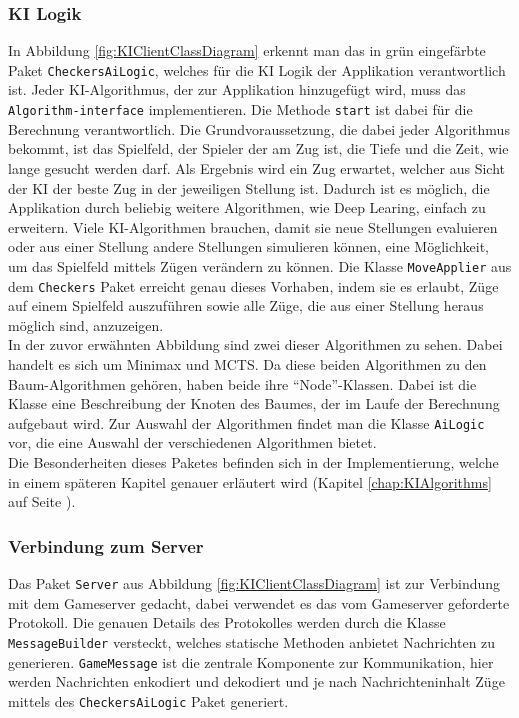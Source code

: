 \documentclass[12pt,a4paper,bibliography=totocnumbered,listof=totocnumbered]{article}
\begin{document}
\subsubsection{\ac{KI} Logik}
In Abbildung \ref{fig:KIClientClassDiagram} erkennt man das in grün eingefärbte Paket \texttt{CheckersAiLogic}, welches für die KI Logik der Applikation verantwortlich ist.
Jeder \ac{KI}-Algorithmus, der zur Applikation hinzugefügt wird, muss das \texttt{Algorithm-interface} implementieren. Die Methode \texttt{start} ist dabei für die Berechnung 
verantwortlich. Die Grundvoraussetzung, die dabei jeder Algorithmus bekommt, ist das Spielfeld, der Spieler der am Zug ist, die Tiefe und die Zeit, wie lange gesucht werden darf.
Als Ergebnis wird ein Zug erwartet, welcher aus Sicht der \ac{KI} der beste Zug in der jeweiligen Stellung ist. Dadurch ist es möglich, die Applikation durch beliebig weitere 
Algorithmen, wie Deep Learing, einfach zu erweitern. 
Viele \ac{KI}-Algorithmen brauchen, damit sie neue Stellungen evaluieren oder aus einer Stellung andere Stellungen simulieren können, eine Möglichkeit, um das Spielfeld mittels 
Zügen verändern zu können. Die Klasse \texttt{MoveApplier} aus dem \texttt{Checkers} Paket erreicht genau dieses Vorhaben, indem sie es erlaubt, Züge auf einem Spielfeld auszuführen 
sowie alle Züge, die aus einer Stellung heraus möglich sind, anzuzeigen.
\\
In der zuvor erwähnten Abbildung sind zwei dieser Algorithmen zu sehen. Dabei handelt es sich um Minimax und MCTS. Da diese beiden Algorithmen zu den Baum-Algorithmen
gehören, haben beide ihre ``Node''-Klassen. Dabei ist die Klasse eine Beschreibung der Knoten des Baumes, der im Laufe der Berechnung aufgebaut wird.
Zur Auswahl der Algorithmen findet man die Klasse \texttt{AiLogic} vor, die eine Auswahl der verschiedenen Algorithmen bietet. 
\\ 
Die Besonderheiten dieses Paketes befinden sich in der Implementierung, welche in einem späteren Kapitel genauer erläutert wird 
(Kapitel \ref{chap:KIAlgorithms} auf Seite \pageref{chap:KIAlgorithms}).

\subsubsection{Verbindung zum Server}
Das Paket \texttt{Server} aus Abbildung \ref{fig:KIClientClassDiagram} ist zur Verbindung mit dem Gameserver gedacht, dabei verwendet es das vom Gameserver geforderte 
Protokoll. Die genauen Details des Protokolles werden durch die Klasse \texttt{MessageBuilder} versteckt, welches statische Methoden anbietet Nachrichten zu generieren.
\texttt{GameMessage} ist die zentrale Komponente zur Kommunikation, hier werden Nachrichten enkodiert und dekodiert und je nach Nachrichteninhalt 
Züge mittels des \texttt{CheckersAiLogic} Paket generiert.
\end{document}
